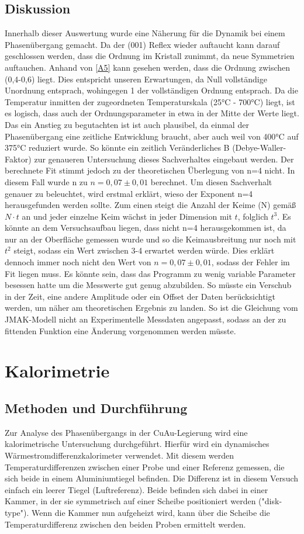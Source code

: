 \documentclass[
	a4paper,
	12pt,
	pagesize,
	ngerman
]{scrartcl}
\begin{document}
\subsection{Diskussion}
Innerhalb dieser Auswertung wurde eine Näherung für die Dynamik bei einem Phasenübergang gemacht. Da der (001) Reflex wieder auftaucht kann darauf geschlossen werden, dass die Ordnung im Kristall zunimmt, da neue Symmetrien auftauchen. Anhand von \cref{A5} kann gesehen werden, dass die Ordnung zwischen (0,4-0,6) liegt. Dies entspricht unseren Erwartungen, da Null vollständige Unordnung entsprach, wohingegen 1 der vollständigen Ordnung entsprach. Da die Temperatur inmitten der zugeordneten Temperaturskala (25°C - 700°C) liegt, ist es logisch, dass auch der Ordnungsparameter in etwa in der Mitte der Werte liegt. Das ein Anstieg zu begutachten ist ist auch plausibel, da einmal der Phasenübergang eine zeitliche Entwicklung braucht, aber auch weil von 400°C auf 375°C reduziert wurde. So könnte ein zeitlich Veränderliches B (Debye-Waller-Faktor) zur genaueren Untersuchung dieses Sachverhaltes eingebaut werden. Der berechnete Fit stimmt jedoch zu der theoretischen Überlegung von n=4 nicht. In diesem Fall wurde n zu $n=0,07 \pm 0,01$ berechnet. Um diesen Sachverhalt genauer zu beleuchtet, wird erstmal erklärt, wieso der Exponent n=4  herausgefunden werden sollte. Zum einen steigt die Anzahl der Keime (N) gemäß $N \cdot t$ an und jeder einzelne Keim wächst in jeder Dimension mit $t$, folglich $t^3$. Es könnte an dem Versuchsaufbau liegen, dass nicht n=4 herausgekommen ist, da nur an der Oberfläche gemessen wurde und so die Keimausbreitung nur noch mit $t^2$ steigt, sodass ein Wert zwischen 3-4 erwartet werden würde. Dies erklärt dennoch immer noch nicht den Wert von $n=0,07 \pm 0,01$, sodass der Fehler im Fit liegen muss. Es könnte sein, dass das Programm zu wenig variable Parameter besessen hatte um die Messwerte gut genug abzubilden. So müsste ein Verschub in der Zeit, eine andere Amplitude oder ein Offset der Daten berücksichtigt werden, um näher am theoretischen Ergebnis zu landen. So ist die Gleichung vom JMAK-Modell nicht an Experimentelle Messdaten angepasst, sodass an der zu fittenden Funktion eine Änderung vorgenommen werden müsste.

\section{Kalorimetrie}
\subsection{Methoden und Durchführung}
Zur Analyse des Phasenübergangs in der CuAu-Legierung wird eine kalorimetrische Untersuchung durchgeführt. Hierfür wird ein dynamisches Wärmestromdifferenzkalorimeter verwendet. Mit diesem werden Temperaturdifferenzen zwischen einer Probe und einer Referenz gemessen, die sich beide in einem Aluminiumtiegel befinden. Die Differenz ist in diesem Versuch einfach ein leerer Tiegel (Luftreferenz). Beide befinden sich dabei in einer Kammer, in der sie symmetrisch auf einer Scheibe positioniert werden ("disk-type"). Wenn die Kammer nun aufgeheizt wird, kann über die Scheibe die Temperaturdifferenz zwischen den beiden Proben ermittelt werden.
\end{document}
